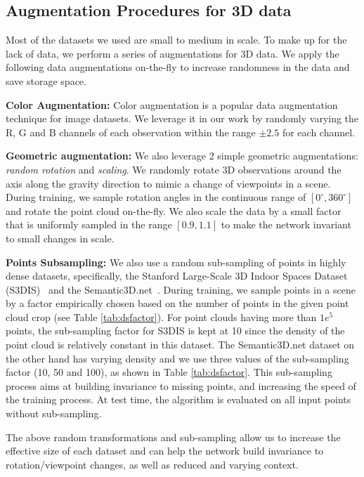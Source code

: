 \documentclass[10pt,twocolumn,letterpaper]{article}
\begin{document}
\subsection{Augmentation Procedures for 3D data}
\label{sec:augmentation}

Most of the datasets we used are small to medium in scale. To make up for the lack of data, we perform a series of augmentations for 3D data. We apply the following data augmentations on-the-fly to increase randomness in the data and save storage space.

\textbf{Color Augmentation:} Color augmentation is a popular data augmentation technique for image datasets. We leverage it in our work by randomly varying the R, G and B channels of each observation within the range $\pm2.5$ for each channel.

\textbf{Geometric augmentation:} We also leverage 2 simple geometric augmentations: \textit{random rotation} and \textit{scaling}. We randomly rotate 3D observations around the axis along the gravity direction to mimic a change of viewpoints in a scene. During training, we sample rotation angles in the continuous range of $[0^{\circ}, 360^{\circ}]$ and rotate the point cloud on-the-fly. We also scale the data by a small factor that is uniformly sampled in the range $[0.9, 1.1]$ to make the network invariant to small changes in scale.

\textbf{Points Subsampling:} We also use a random sub-sampling of points in highly dense datasets, specifically, the Stanford Large-Scale 3D Indoor Spaces Dataset (S3DIS)~\cite{Armeni2016} and the Semantic3D.net~\cite{l3d}. During training, we sample points in a scene by a factor empirically chosen based on the number of points in the given point cloud crop (see Table \ref{tab:dsfactor}). For point clouds having more than $1e^5$ points, the sub-sampling factor for S3DIS is kept at 10 since the density of the point cloud is relatively constant in this dataset. The Semantic3D.net dataset on the other hand has varying density and we use three values of the sub-sampling factor (10, 50 and 100), as shown in Table \ref{tab:dsfactor}. This sub-sampling process aims at building invariance to missing points, and increasing the speed of the training process. At test time, the algorithm is evaluated on all input points without sub-sampling.

The above random transformations and sub-sampling allow us to increase the effective size of each dataset and can help the network build invariance to rotation/viewpoint changes, as well as reduced and varying context.
\end{document}
